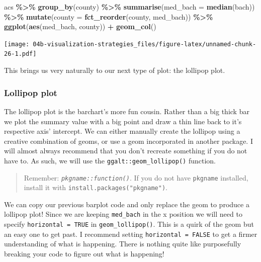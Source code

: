 \documentclass[
]{book}
\newenvironment{Shaded}{\begin{snugshade}}{\end{snugshade}}
\newcommand{\DataTypeTok}[1]{\textcolor[rgb]{0.13,0.29,0.53}{#1}}
\newcommand{\KeywordTok}[1]{\textcolor[rgb]{0.13,0.29,0.53}{\textbf{#1}}}
\newcommand{\NormalTok}[1]{#1}
\newcommand{\OperatorTok}[1]{\textcolor[rgb]{0.81,0.36,0.00}{\textbf{#1}}}
\newcommand{\StringTok}[1]{\textcolor[rgb]{0.31,0.60,0.02}{#1}}
\begin{document}
\begin{Shaded}
\begin{Highlighting}[]
\NormalTok{acs }\OperatorTok{\%\textgreater{}\%}\StringTok{ }
\StringTok{  }\KeywordTok{group\_by}\NormalTok{(county) }\OperatorTok{\%\textgreater{}\%}\StringTok{ }
\StringTok{  }\KeywordTok{summarise}\NormalTok{(}\DataTypeTok{med\_bach =} \KeywordTok{median}\NormalTok{(bach)) }\OperatorTok{\%\textgreater{}\%}\StringTok{ }
\StringTok{  }\KeywordTok{mutate}\NormalTok{(}\DataTypeTok{county =} \KeywordTok{fct\_reorder}\NormalTok{(county, med\_bach)) }\OperatorTok{\%\textgreater{}\%}\StringTok{ }
\StringTok{  }\KeywordTok{ggplot}\NormalTok{(}\KeywordTok{aes}\NormalTok{(med\_bach, county)) }\OperatorTok{+}\StringTok{ }
\StringTok{  }\KeywordTok{geom\_col}\NormalTok{()}
\end{Highlighting}
\end{Shaded}

\texttt{[image: 04b-visualization-strategies\_files/figure-latex/unnamed-chunk-26-1.pdf]}

This brings us very naturally to our next type of plot: the lollipop plot.

\hypertarget{lollipop-plot}{%
\subsubsection{Lollipop plot}\label{lollipop-plot}}

The lollipop plot is the barchart's more fun cousin. Rather than a big thick bar we plot the summary value with a big point and draw a thin line back to it's respective axis' intercept. We can either manually create the lollipop using a creative combination of geoms, or use a geom incorporated in another package. I will almost always recommend that you don't recreate something if you do not have to. As such, we will use the \texttt{ggalt::geom\_lollipop()} function.

\begin{quote}
Remember: \emph{\texttt{pkgname::function()}}. If you do not have \texttt{pkgname} installed, install it with \texttt{install.packages("pkgname")}.
\end{quote}

We can copy our previous barplot code and only replace the geom to produce a lollipop plot! Since we are keeping \texttt{med\_bach} in the x position we will need to specify \texttt{horizontal\ =\ TRUE} in \texttt{geom\_lollipop()}. This is a quirk of the geom but an easy one to get past. I recommend setting \texttt{horizontal\ =\ FALSE} to get a firmer understanding of what is happening. There is nothing quite like purposefully breaking your code to figure out what is happening!
\end{document}
